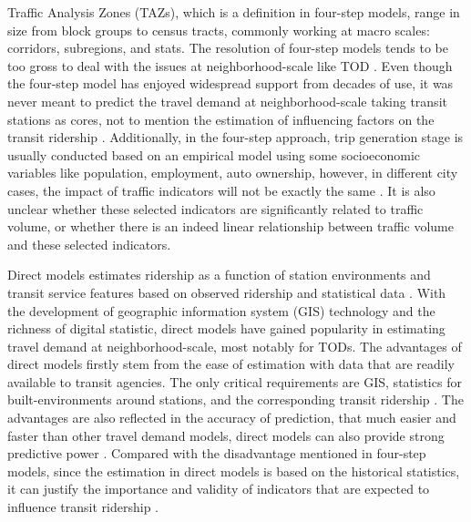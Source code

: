Traffic Analysis Zones (TAZs), which is a definition in four-step models, range in size from block groups to census tracts, commonly working at macro scales: corridors, subregions, and stats. The resolution of four-step models tends to be too gross to deal with the issues at neighborhood-scale like TOD \cite{cervero2006alternative}. Even though the four-step model has enjoyed widespread support from decades of use, it was never meant to predict the travel demand at neighborhood-scale taking transit stations as cores, not to mention the estimation of influencing factors on the transit ridership \cite{cervero2006alternative,chu2004ridership,duduta2013direct}. Additionally, in the four-step approach, trip generation stage is usually conducted based on an empirical model using some socioeconomic variables like population, employment, auto ownership, however, in different city cases, the impact of traffic indicators will not be exactly the same \cite{jones1983demand}. It is also unclear whether these selected indicators are significantly related to traffic volume, or whether there is an indeed linear relationship between traffic volume and these selected indicators. 

Direct models estimates ridership as a function of station environments and transit service features based on observed ridership and statistical data \cite{cervero2006alternative}. With the development of geographic information system (GIS) technology and the richness of digital statistic, direct models have gained popularity in estimating travel demand at neighborhood-scale, most notably for TODs. The advantages of direct models firstly stem from the ease of estimation with data that are readily available to transit agencies. The only critical requirements are GIS, statistics for built-environments around stations, and the corresponding transit ridership \cite{guerra2012half}. The advantages are also reflected in the accuracy of prediction, that much easier and faster than other travel demand models, direct models can also provide strong predictive power \cite{lane2006sketch}. Compared with the disadvantage mentioned in four-step models, since the estimation in direct models is based on the historical statistics, it can justify the importance and validity of indicators that are expected to influence transit ridership \cite{walters2003forecasting}.

